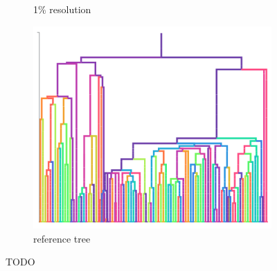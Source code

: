 \begin{figure}
\begin{subfigure}[b]{\linewidth}
    \caption{1\% resolution}
    \label{fig:perfect-tree-phylometrics-sensitivity-analysis:exponential}
  \end{subfigure}
  \begin{subfigure}[b]{\linewidth}
    \centering
    \includegraphics[width=\textwidth, height=0.16\textheight]{img/reference}
    \caption{reference tree}
    \label{fig:perfect-tree-phylometrics-sensitivity-analysis:exponential}
  \end{subfigure}
  \caption{TODO}
  \label{fig:perfect-tree-phylometrics-sensitivity-analysis}
\end{figure}
